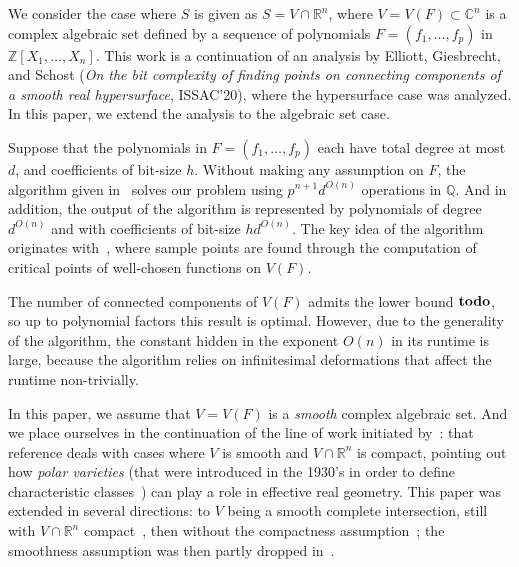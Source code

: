 \documentclass[a4paper]{article}
\newcommand{\ZZ}{{\mathbb{Z}}}
\def\C{\mathbb{C}}
\def\Q{\mathbb{Q}}
\def\R{\mathbb{R}}
\def\td{{\bf todo}}
\begin{document}
We consider the case where $S$ is given as $S=V \cap
\R^n$, where $V=V(F) \subset \C^n$ is a complex algebraic set defined
by a sequence of polynomials $F = (f_1,\hdots,f_p)$ in $\ZZ[X_1,\dots,X_n]$.  This work is a continuation of an analysis by Elliott, Giesbrecht, and Schost ({\em On the bit complexity of finding points on connecting components of a smooth real hypersurface}, ISSAC'20), where the hypersurface case was analyzed. In this paper, we extend the analysis to the algebraic set case.

Suppose that the polynomials in $F = (f_1,\hdots,f_p)$ each have total degree at most $d$, and coefficients of bit-size $h$. Without making any assumption on $F$, the algorithm given
in~\cite[Section~13.1]{BaPoRo03} solves our problem using $p^{n+1}d^{O(n)}$
operations in $\Q$. And in addition, the output of the algorithm is
represented by polynomials of degree $d^{O(n)}$ and with coefficients of
bit-size $hd^{O(n)}$.  The key idea of the algorithm originates with~\cite{GrVo88}, where sample points are found through the computation of
critical points of well-chosen functions on $V(F)$.


The number of connected components of $V(F)$ admits the lower bound $\td$, so up to polynomial factors this result is
optimal. However, due to the generality of the algorithm, the constant
hidden in the exponent $O(n)$ in its runtime is
large, because the algorithm relies on infinitesimal deformations that affect
the runtime non-trivially.


In this paper, we assume that
$V=V(F)$ is a {\em smooth} complex algebraic set. And we place ourselves in
the continuation of the line of work initiated by~\cite{BaGiHeMb97}:
that reference deals with cases where $V$ is smooth and $V \cap \R^n$
is compact, pointing out how {\em polar varieties} (that were
introduced in the 1930's in order to define characteristic
classes~\cite{Piene78,Teissier88}) can play a role in effective real
geometry. This paper was extended in several directions: to $V$ being
a smooth complete intersection, still with $V\cap \R^n$
compact~\cite{BaGiHeMb01}, then without the compactness
assumption~\cite{EMP,BaGiHePa05}; the smoothness assumption was then partly
dropped in~\cite{BaGiHe14,BaGiHeLePa12}.
\end{document}
